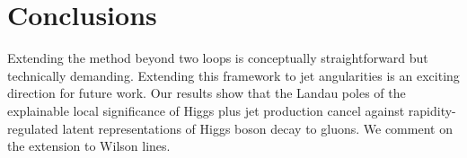 \section{Conclusions}\label{sec:conclusions}

Extending the method beyond two loops is conceptually straightforward
but technically demanding. Extending this framework to jet angularities
is an exciting direction for future work. Our results show that the
Landau poles of the explainable local significance of Higgs plus jet
production cancel against rapidity-regulated latent representations of
Higgs boson decay to gluons. We comment on the extension to Wilson
lines.

